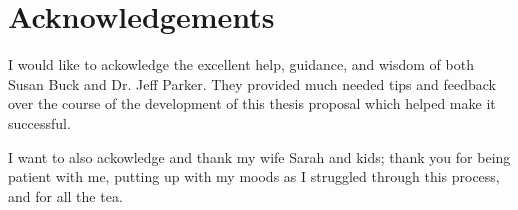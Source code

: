 %
\chapter*{Acknowledgements}
\label{sec:acknowledgements}
\vspace*{-10mm}


I would like to ackowledge the excellent help, guidance, and wisdom of both Susan Buck and Dr. Jeff Parker.  They provided much needed tips and feedback over the course of the development of this thesis proposal which helped make it successful.

I want to also ackowledge and thank my wife Sarah and kids; thank you for being patient with me, putting up with my moods as I struggled through this process, and for all the tea.

